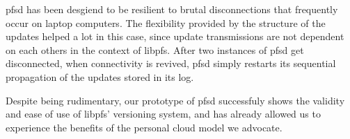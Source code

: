 pfsd has been desgiend to be resilient to brutal
disconnections that frequently occur on laptop computers. The
flexibility provided by the structure of the updates helped a lot in
this case, since update transmissions are not dependent on each others
in the context of libpfs. After two instances of pfsd get
disconnected, when connectivity is revived, pfsd simply restarts its
sequential propagation of the updates stored in its log.

Despite being rudimentary, our prototype of pfsd successfuly
shows the validity and ease of use of libpfs' versioning system, and
has already allowed us to experience the benefits of the personal
cloud model we advocate.

